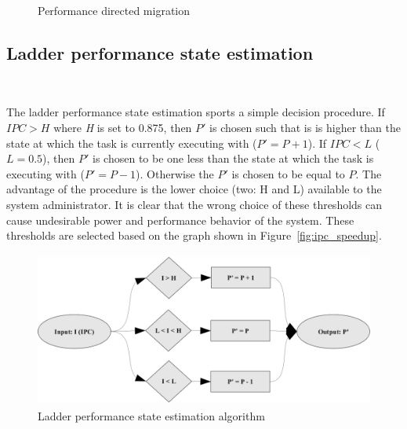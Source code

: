 \begin{figure}[h!]
  \begin{center}
    \caption{Performance directed migration}
    \label{fig:pds_migration}
  \end{center}
\end{figure}


\subsection{Ladder performance state estimation}~\label{sec:ladder}

The ladder performance state estimation sports a simple decision procedure. If $IPC > H$ 
where \textit{H} is set to 0.875, then $P'$ is chosen such that is is higher than the state
at which the task is currently executing with ($P' = P + 1$). If $IPC < L$ ($L = 0.5$), then 
$P'$ is chosen to be one less than the state at which the task is executing with ($P' = P - 1$). 
Otherwise the $P'$ is chosen to be equal to $P$. The advantage of the procedure is the lower
choice (two: H and L) available to the system administrator. It is clear that the wrong choice of these
thresholds can cause undesirable power and performance behavior of the system. These thresholds are
selected based on the graph shown in Figure~\ref{fig:ipc_speedup}. 

\begin{figure}[h!]
  \begin{center}
    \includegraphics[height=2in]{figures/Ladder_Evaluation.jpg}
    \caption{Ladder performance state estimation algorithm}
    \label{fig:ladder_method}
  \end{center}
\end{figure}

